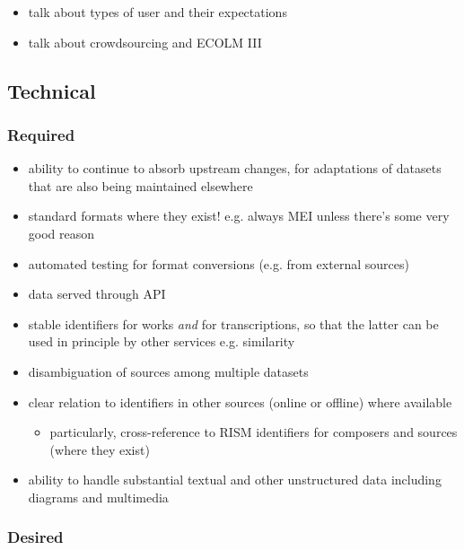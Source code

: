 \documentclass[sigconf]{acmart}
\begin{document}
\begin{sloppypar}
  \begin{itemize}
  \item talk about types of user and their expectations
  \item talk about crowdsourcing and ECOLM III
  \end{itemize}

  
  \subsection{Technical}

  \subsubsection{Required}
  
  \begin{itemize}
  \item ability to continue to absorb upstream changes, for
    adaptations of datasets that are also being maintained elsewhere
  \item standard formats where they exist! e.g. always MEI unless
    there's some very good reason
  \item automated testing for format conversions (e.g. from external sources)
  \item data served through API
  \item stable identifiers for works {\em and} for transcriptions, so
    that the latter can be used in principle by other services
    e.g. similarity
  \item disambiguation of sources among multiple datasets
  \item clear relation to identifiers in other sources (online or
    offline) where available
    \begin{itemize}
    \item particularly, cross-reference to RISM identifiers for
      composers and sources (where they exist)
    \end{itemize}
  \item ability to handle substantial textual and other unstructured
    data including diagrams and multimedia

  \end{itemize}

  \subsubsection{Desired}
  

\end{sloppypar}
\end{document}
